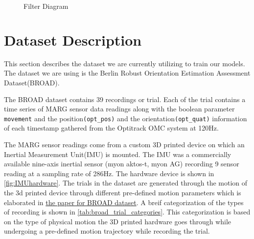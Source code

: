 \documentclass{iutbscthesis}
\begin{document}
\begin{figure}
    \centering
    
    \caption{Filter Diagram}
    \label{Filter Diagram}
\end{figure}

\section{Dataset Description} \label{section:dataset}
This section describes the dataset we are currently utilizing to train our models. The dataset we are using is the Berlin Robust Orientation Estimation Assessment Dataset(BROAD)\cite{BROAD}. 

The BROAD dataset contains 39 recordings or trial. Each of the trial contains a time series of MARG sensor data readings along with the boolean parameter \texttt{movement} and the position\texttt{(opt\_pos)} and the orientation\texttt{(opt\_quat)} information of each timestamp gathered from the Optitrack OMC system at 120Hz. 

The MARG sensor readings come from a custom 3D printed device on which an Inertial Measurement Unit(IMU) is mounted. The IMU was a commercially available nine-axis inertial sensor (myon aktos-t, myon AG) recording 9 sensor reading at a sampling rate of 286Hz. The hardware device is shown in \autoref{fig:IMUhardware}. The trials in the dataset are generated through the motion of the 3d printed device through different pre-defined motion parameters which is elaborated in \hyperlink{https://www.mdpi.com/2306-5729/6/7/72}{the paper for BROAD dataset}. A breif categorization of the types of recording is shown in \autoref{tab:broad_trial_categories}. This categorization is based on the type of physical motion the 3D printed hardware goes through while undergoing a pre-defined motion trajectory while recording the trial.
\end{document}
